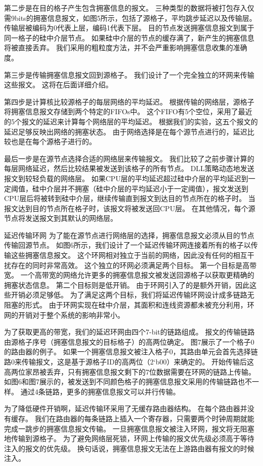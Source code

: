 第二步是在目的格子产生包含拥塞信息的报文。
三种类型的数据将被打包存入仅需9bits的拥塞信息报文，如图5所示，包括了源格子，平均跳步延迟以及传输层。
传输层被编码为0代表上层，编码1代表下层。
目的节点发送拥塞信息报文到属于同一格子的硅中介层节点。
如果硅中介层的节点的缓存满了，新产生的拥塞信息将被直接丢弃。
我们采用的粗粒度方法，并不会严重影响拥塞信息收集的准确度。

第三步是传输拥塞信息报文回到源格子。
我们设计了一个完全独立的环网来传输这些报文。
这将在后面详细介绍。

第四步是计算核比较源格子的每层网络的平均延迟。
根据传输的网络层，源格子将拥塞信息报文存储到两个特定的FIFOs中。
这个FIFO有5个空位，采用了最近的5个报文的延迟来计算每个网络层的平均延迟。
根据我们的实验，这五个报文的延迟足够反映出网络的拥塞状态。
由于网络选择是在每个源节点进行的，延迟比较也是在每个源格子进行的。

最后一步是在源节点选择合适的网络层来传输报文。
我们比较了之前步骤计算的每层网络延迟，然后比较结果被发送到该格子的所有节点。
DLL策略动态地发送报文到较轻负载的网络层。
如果CPU层的平均延迟超过硅中介层的平均延迟到一定阈值，硅中介层并不拥塞（硅中介层的平均延迟小于一定阈值），报文发送到CPU层后将被转到硅中介层，继续传输直到报文到达目的节点所在的格子时。
当报文达到目的节点所在格子时，该报文将被发送回CPU层。
在其他情况，每个源节点将发送报文到其默认的网络层。


延迟传输环网
为了能在源节点进行网络层的选择，拥塞信息报文必须从目的节点传输回源节点。
如图6所示，我们设计了一个延迟传输环网连接着所有的格子以传输这些拥塞信息报文。
这个环网相对独立于当前的网络，因此没有任何的相互干扰存在的同时非常高效。
这个独立的环网必须满足两个目标。
第一个目标是高带宽。
一个高带宽的网络允许更多的拥塞信息报文被发送回源格子以获取更精确的拥塞状态信息。
第二个目标则是低开销。
由于环网引入了的是额外开销，因此这些开销必须足够低。
为了满足这两个目标，我们将延迟传输环网设计成多链路无阻塞的形式。
由于环网实现在硅中介层，其面积和连线资源都未被充分利用，环网的开销对于整个系统的影响非常小。

为了获取更高的带宽，我们的延迟环网由四个7-bit的链路组成。
报文的传输链路由源格子序号（拥塞信息报文的目标格子）的高两位确定。
图7展示了一个格子0的路由器的例子。
如果一个拥塞信息报文被注入格子0，其路由单元会首先选择链路0来传输报文，这是基于源格子ID的高两位（2‘b00）来确定的。
开始传输后这高两位家昂被丢弃，只有拥塞信息报文剩下的7位数据需要在环网的链路上传输。
如图6和图7展示的，被发送到不同颜色格子的拥塞信息报文采用的传输链路也不一样。
通过4条链路，更多的拥塞信息报文可以并行传输。

为了降低硬件开销啊，延迟传输环采用了无缓存路由器结构。
在每个路由器并没有缓存。
我们在路由器的每条链路上插入一个寄存器，只需要两个时钟周期就能完成一跳步的拥塞信息报文传输。
一旦拥塞信息报文被注入环网，报文将无阻塞地传输到源格子。
为了避免网络层死锁，环网上传输的报文优先级必须高于等待注入的报文的优先级。
换句话说，拥塞信息报文无法在上游路由器有报文的时候注入。

